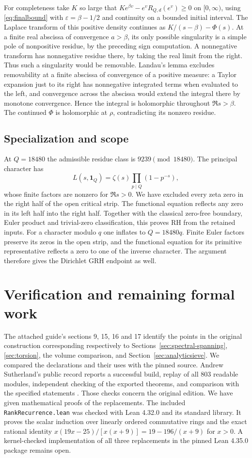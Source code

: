 For completeness take $K$ so large that $K e^{\beta v}-e^vR_{Q,d}(e^v)\ge0$ on $[0,\infty)$, using \eqref{eq:finalbound} with $\varepsilon=\beta-1/2$ and continuity on a bounded initial interval. The Laplace transform of this positive density continues as $K/(s-\beta)-\Phi(s)$. At a finite real abscissa of convergence $a>\beta$, its only possible singularity is a simple pole of nonpositive residue, by the preceding sign computation. A nonnegative transform has nonnegative residue there, by taking the real limit from the right. Thus such a singularity would be removable. Landau's lemma excludes removability at a finite abscissa of convergence of a positive measure: a Taylor expansion just to its right has nonnegative integrated terms when evaluated to the left, and convergence across the abscissa would extend the integral there by monotone convergence. Hence the integral is holomorphic throughout $\Re s>\beta$. The continued $\Phi$ is holomorphic at $\rho$, contradicting its nonzero residue.

\subsection*{Specialization and scope}
At $Q=18480$ the admissible residue class is $9239\pmod{18480}$. The principal character has
\[
 L(s,\mathbf1_Q)=\zeta(s)\prod_{p\mid Q}(1-p^{-s}),
\]
whose finite factors are nonzero for $\Re s>0$. We have excluded every zeta zero in the right half of the open critical strip. The functional equation reflects any zero in its left half into the right half. Together with the classical zero-free boundary, Euler product and trivial-zero classification, this proves RH from the retained inputs. For a character modulo $q$ one inflates to $Q=18480q$. Finite Euler factors preserve its zeros in the open strip, and the functional equation for its primitive representative reflects a zero to one of the inverse character. The argument therefore gives the Dirichlet GRH endpoint as well.

\section{Verification and remaining formal work}
The attached guide's sections 9, 15, 16 and 17 identify the points in the original construction corresponding respectively to Sections~\ref{sec:spectral-spanning}, \ref{sec:torsion}, the volume comparison, and Section~\ref{sec:analyticsieve}. We compared the declarations and their uses with the pinned source. Andrew Sutherland's public record reports a successful build, replay of all 803 readable modules, independent checking of the exported theorems, and comparison with the specified statements \cite{check}. Those checks concern the original edition. We have given mathematical proofs of the replacements. The included \texttt{RankRecurrence.lean} was checked with Lean 4.32.0 and its standard library. It proves the scalar induction over linearly ordered commutative rings and the exact rational identity $x(19x-25)/[x(x+9)]=19-196/(x+9)$ for $x>0$. A kernel-checked implementation of all three replacements in the pinned Lean 4.35.0 package remains open.

